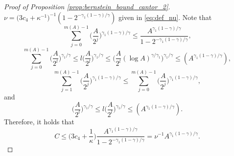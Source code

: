 \documentclass[11pt]{article}
\theoremstyle{plain}
\theoremstyle{definition}
\begin{document}
\begin{proof}[Proof of Proposition \ref{prop:bernstein_bound_cantor_2}]
$\nu = \big(3c_4 + \kappa^{-1} \big)^{-1}(1 - 2^{-\gamma_1(1-\gamma)/\gamma})$ given in \eqref{eq:def_nu}.
Note that
\begin{equation*}
    \sum_{j=0}^{m(A)-1}\Big(\frac{A}{2^j}\Big)^{\gamma_1(1-\gamma)/\gamma} \leq \frac{A^{\gamma_1(1-\gamma)/\gamma}}{1 - 2^{-\gamma_1(1-\gamma)/\gamma}},
\end{equation*}
\begin{equation*}
    \sum_{j=0}^{m(A)-1}\Big(\frac{A}{2^l}\Big)^{\gamma_1/\gamma} \leq l\Big(\frac{A}{2^l}\Big)^{\gamma_1/\gamma} \leq \Big(\frac{A}{2^l}(\log A)^{\gamma/\gamma_1}\Big)^{\gamma_1/\gamma} \leq (A^{\gamma_1(1-\gamma)/\gamma}),
\end{equation*}
\begin{equation*}
    \sum_{j = 1}^{m(A)-1}\Big(\frac{A}{2^j}\Big)^{\gamma_1(1-\gamma)/\gamma} \leq \sum_{j=0}^{m(A)-1}\Big(\frac{A}{2^j}\Big)^{\gamma_1(1-\gamma)/\gamma},
\end{equation*}
and
\begin{equation*}
    \Big(\frac{A}{2^l}\Big)^{\gamma_1/\gamma} \leq l\Big(\frac{A}{2^l}\Big)^{\gamma_1/\gamma} \leq (A^{\gamma_1(1-\gamma)/\gamma}).
\end{equation*}
Therefore, it holds that
\begin{equation*}
    C \leq \Big(3c_4 + \frac{1}{\kappa}\Big)\frac{A^{\gamma_1(1-\gamma)/\gamma}}{1 - 2^{-\gamma_1(1-\gamma)/\gamma}} = \nu^{-1}A^{\gamma_1(1-\gamma)/\gamma}.
\end{equation*}


\end{proof}
\end{document}
